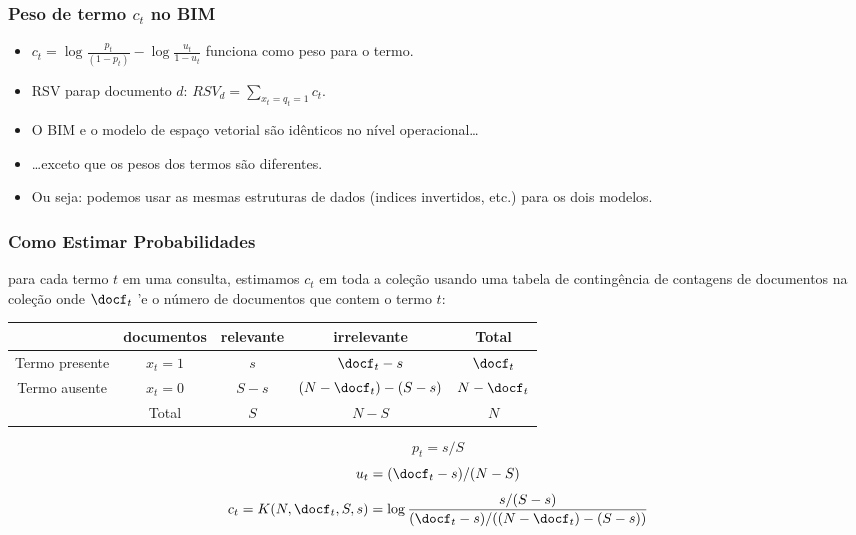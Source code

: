 \documentclass[compress]{beamer}
\begin{document}
\begin{frame}[<+->]
\frametitle{Peso de termo $c_t$ no  BIM}
\pause[2]

\begin{itemize}
\item $c_t=\log \frac{p_t}{(1-p_t)} - \log \frac{u_t}{1-u_t}$ funciona como peso para o termo.
\item RSV parap documento $d$: $RSV_d =
\sum_{x_t=q_t=1} c_t$.  
\item O BIM e o modelo de espaço vetorial são idênticos no nível operacional\ldots
\item \ldots exceto que os pesos dos termos são diferentes.
\item Ou seja: podemos usar as mesmas estruturas de dados (indices invertidos, etc.) para os dois modelos.
\end{itemize}
\end{frame}


\begin{frame}[<+->]
\frametitle{Como Estimar Probabilidades}
\pause[2]

para cada termo $t$ em uma consulta, estimamos $c_t$ em toda a coleção usando uma tabela de contingência de contagens de documentos na coleção onde $\docf_t$ 'e o número de documentos que contem o termo $t$:
%
\begin{tabular}[t]{|cc|cc|c|}
\hline
             & documentos & relevante & irrelevante & Total \\ \hline
Termo presente & $x_t = 1$ & $s$ & $\docf_t-s$ & $\docf_t$ \\
Termo ausente & $x_t = 0$ & $S-s$ & $(N-\docf_t)-(S-s)$ & $N-\docf_t$ \\ \hline
             & Total & $S$ & $N-S$ & $N$ \\ \hline
\end{tabular}

%
\begin{equation}
\nonumber
 p_t = s/S  
\end{equation}
\begin{equation}
\nonumber
u_t = (\docf_t-s)/(N-S) 
\end{equation}
\begin{equation}
\nonumber
c_t = K(N,\docf_t,S,s) = \log\frac{s/(S-s)}{(\docf_t-s)/((N-\docf_t)-(S-s))}  
\end{equation}


\end{frame}
\end{document}
